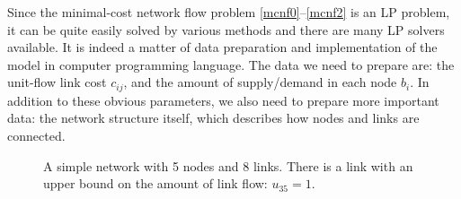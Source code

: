 Since the minimal-cost network flow problem \eqref{mcnf0}--\eqref{mcnf2} is an LP problem, it can be quite easily solved by various methods and there are many LP solvers available. It is indeed a matter of data preparation and implementation of the model in computer programming language. The data we need to prepare are: the unit-flow link cost $c_{ij}$, and the amount of supply/demand in each node $b_i$. In addition to these obvious parameters, we also need to prepare more important data: the network structure itself, which describes how nodes and links are connected.



\begin{figure} \centering
{}
\caption{A simple network with 5 nodes and 8 links. There is a link with an upper bound on the amount of link flow: $u_{35}=1$. \label{fig:example_mcnf}}
\end{figure}


